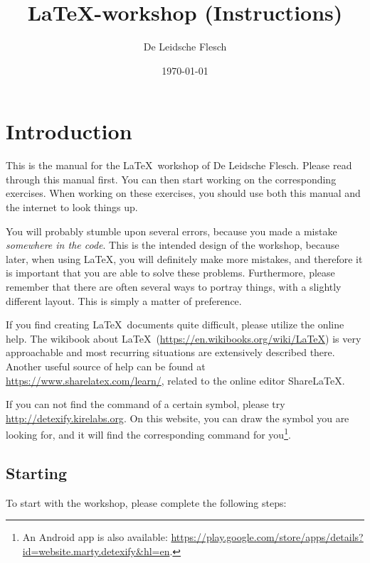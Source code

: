 \documentclass{article}
\title{\LaTeX-workshop (Instructions)}
\author{De Leidsche Flesch}
\date{\today}
\begin{document}
\maketitle
\tableofcontents
\newpage

\section{Introduction}

This is the manual for the \LaTeX\ workshop of De Leidsche Flesch.
Please read through this manual first. You can then start working on the corresponding exercises. 
When working on these exercises, you should use both this manual and the internet to look things up.

You will probably stumble upon several errors, because you made a mistake \emph{somewhere in the code}.
This is the intended design of the workshop, because later, when using \LaTeX, you will definitely make more mistakes,
and therefore it is important that you are able to solve these problems. Furthermore, please remember that there are often several ways to portray things, with a slightly different layout. 
This is simply a matter of preference.

If you find creating \LaTeX\ documents quite difficult, please utilize the online help. The wikibook about \LaTeX\ (\url{https://en.wikibooks.org/wiki/LaTeX}) is very approachable and most recurring situations are extensively described there. 
Another useful source of help can be found at \url{https://www.sharelatex.com/learn/}, related to the online editor ShareLaTeX.

If you can not find the command of a certain symbol, please try \url{http://detexify.kirelabs.org}. 
On this website, you can draw the symbol you are looking for, and it will find the corresponding command for you\footnote{An Android app is also available: \url{https://play.google.com/store/apps/details?id=website.marty.detexify\&hl=en}.}. 

\subsection{Starting}

To start with the workshop, please complete the following steps:
\end{document}
